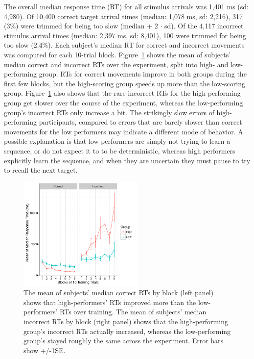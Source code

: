 \documentclass[man,floatsintext]{apa6}
\begin{document}
The overall median response time (RT) for all stimulus arrivals was 1,401 ms (sd: 4,980). Of 10,400 correct target arrival times (median: 1,078 ms, sd: 2,216), 317 (3\%) were trimmed for being too slow (median + 2 $\cdot$ sd). Of the 4,117 incorrect stimulus arrival times (median: 2,397 ms, sd: 8,401), 100 were trimmed for being too slow (2.4\%). Each subject's median RT for correct and incorrect movements was computed for each 10-trial block. Figure~\ref{fig:basic-hitRT} shows the mean of subjects' median correct and incorrect RTs over the experiment, split into high- and low-performing group. RTs for correct movements improve in both groups during the first few blocks, but the high-scoring group speeds up more than the low-scoring group. Figure~\ref{fig:basic-hitRT} also shows that the rare incorrect RTs for the high-performing group get slower over the course of the experiment, whereas the low-performing group's incorrect RTs only increase a bit. The strikingly slow errors of high-performing participants, compared to errors that are barely slower than correct movements for the low performers may indicate a different mode of behavior. A possible explanation is that low performers are simply not trying to learn a sequence, or do not expect it to to be deterministic, whereas high performers explicitly learn the sequence, and when they are uncertain they must pause to try to recall the next target. 

\begin{figure}[h]
  \centering
  \includegraphics[width=0.55\textwidth]{figures/RL_RT_over_time_by_medSplit_n_correct}
  \caption{The mean of subjects' median correct RTs by block (left panel) shows that high-performers' RTs improved more than the low-performers' RTs over training. The mean of subjects' median incorrect RTs by block (right panel) shows that the high-performing group's incorrect RTs actually increased, whereas the low-performing group's stayed roughly the same across the experiment. Error bars show +/-1SE.}
  \label{fig:basic-hitRT}
\end{figure}
\end{document}
